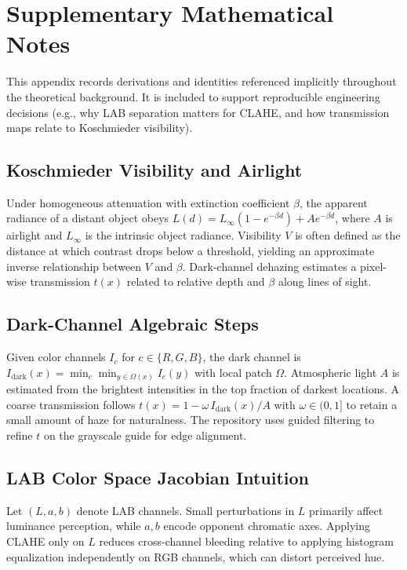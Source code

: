 \section{Supplementary Mathematical Notes}
\label{app:math}
This appendix records derivations and identities referenced implicitly throughout the theoretical background. It is included to support reproducible engineering decisions (e.g., why LAB separation matters for CLAHE, and how transmission maps relate to Koschmieder visibility).

\subsection{Koschmieder Visibility and Airlight}
Under homogeneous attenuation with extinction coefficient $\beta$, the apparent radiance of a distant object obeys $L(d)=L_\infty (1-e^{-\beta d}) + A e^{-\beta d}$, where $A$ is airlight and $L_\infty$ is the intrinsic object radiance. Visibility $V$ is often defined as the distance at which contrast drops below a threshold, yielding an approximate inverse relationship between $V$ and $\beta$. Dark-channel dehazing estimates a pixel-wise transmission $t(x)$ related to relative depth and $\beta$ along lines of sight.

\subsection{Dark-Channel Algebraic Steps}
Given color channels $I_c$ for $c\in\{R,G,B\}$, the dark channel is $I_{\mathrm{dark}}(x)=\min_c \min_{y\in\Omega(x)} I_c(y)$ with local patch $\Omega$. Atmospheric light $A$ is estimated from the brightest intensities in the top fraction of darkest locations. A coarse transmission follows $t(x)=1-\omega\, I_{\mathrm{dark}}(x)/A$ with $\omega\in(0,1]$ to retain a small amount of haze for naturalness. The repository uses guided filtering to refine $t$ on the grayscale guide for edge alignment.

\subsection{LAB Color Space Jacobian Intuition}
Let $(L,a,b)$ denote LAB channels. Small perturbations in $L$ primarily affect luminance perception, while $a,b$ encode opponent chromatic axes. Applying CLAHE only on $L$ reduces cross-channel bleeding relative to applying histogram equalization independently on RGB channels, which can distort perceived hue.

